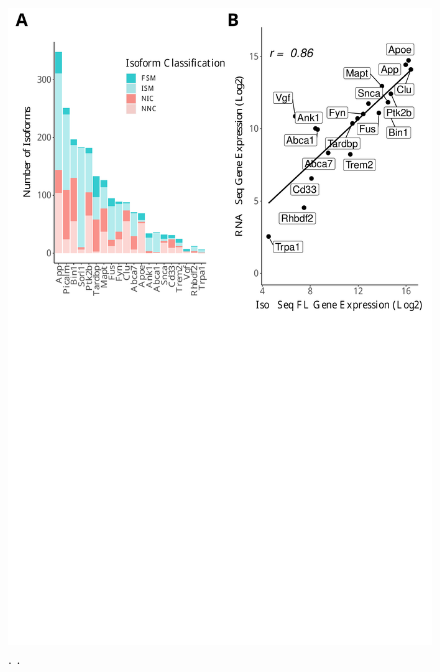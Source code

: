 \begin{figure}[!htp]
	\begin{center}
		\includegraphics[page=5,trim={0 0cm 0 0cm},clip,scale = 0.60]{Figures/ONTvsIsoSeq.pdf}
	\end{center}
	\captionsetup{width=0.95\textwidth}
	\caption[]%
	{\textbf{ }. .}
	\label{fig:commonvsunique_description}
\end{figure}


